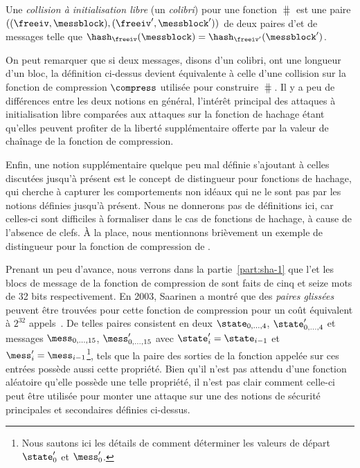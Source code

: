 \begin{fdefi}
Une \emph{collision à initialisation libre} (un \emph{colibri})
pour une fonction \merkdam 
$\hash$ est une paire $((\freeiv,\messblock), (\freeiv',\messblock'))$
de deux paires d'\iv et de messages telle que $\hash_\freeiv(\messblock) = \hash_{\freeiv'}(\messblock')$.
\end{fdefi}

On peut remarquer que si deux messages, disons d'un colibri, ont une longueur d'un bloc, la définition ci-dessus devient équivalente à celle
d'une collision sur la fonction de compression
$\compress$ utilisée pour construire $\hash$.
Il y a peu de différences entre les deux notions en général, l'intérêt principal des
attaques à initialisation libre comparées aux attaques sur la fonction de hachage étant qu'elles
peuvent profiter de la liberté supplémentaire offerte par la valeur de chaînage de la fonction de compression.

\bigskip

Enfin, une notion supplémentaire quelque peu mal définie s'ajoutant à celles discutées jusqu'à présent est le concept de distingueur pour fonctions de hachage,
qui cherche à capturer les comportements non idéaux qui ne le sont pas par les notions définies jusqu'à présent. Nous ne donnerons pas de définitions ici,
car celles-ci sont difficiles à formaliser dans le cas de fonctions de hachage, à cause de l'absence de clefs. À la place, nous mentionnons brièvement
un exemple de distingueur pour la fonction de compression de \shaone. 

Prenant un peu d'avance, nous verrons dans la partie~\ref{part:sha-1} que l'\iv et les blocs de message  de la fonction
de compression de \shaone sont faits de cinq et seize mots de 32 bits respectivement.
En 2003, Saarinen a montré que des \emph{paires glissées} peuvent être trouvées pour cette fonction de compression pour un coût
équivalent à $2^{32}$ appels~\cite{DBLP:conf/fse/Saarinen03}.
De telles paires consistent en deux
\ivs $\state_{0,\ldots,4}$, $\state'_{0,\ldots,4}$ et messages $\mess_{0,\ldots,15}$,
$\mess'_{0,\ldots,15}$ avec $\state'_i = \state_{i-1}$ et $\mess'_i = \mess_{i-1}$\footnote{Nous sautons ici les détails de comment déterminer les valeurs de départ
$\state'_0$ et $\mess'_0$.}, tels que la paire des sorties de la fonction appelée sur ces entrées possède aussi cette propriété.
Bien qu'il n'est pas attendu d'une fonction aléatoire qu'elle possède une telle propriété, il n'est pas clair comment celle-ci peut être utilisée pour monter
une attaque sur une des notions de sécurité principales et secondaires définies ci-dessus.


